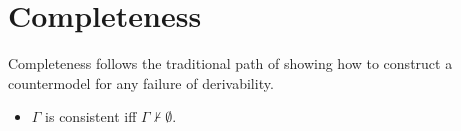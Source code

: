 \documentclass[10pt]{article}
\begin{document}


\newpage

\section{Completeness}
\label{sec:completeness-ideas}

Completeness follows the traditional path of showing how to construct a countermodel for any failure of derivability.

\begin{definition}[Consistency]
  \begin{itemize}
  \item \(\Gamma\) is consistent iff \(\Gamma \nvdash \emptyset\).
  \end{itemize}
\end{definition}
\end{document}
